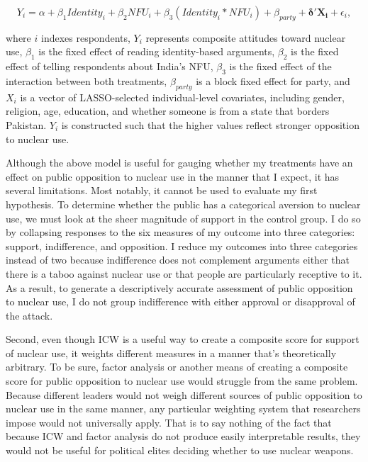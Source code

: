 \documentclass[12pt]{article}
\begin{document}
\begin{equation}
Y_i=\alpha+\beta_1Identity_i+\beta_2NFU_i+\beta_3(Identity_i*NFU_i)+\beta_{party}+\mathbf{\delta'X_i} +\epsilon_{i},
\end{equation}

\noindent
where $i$ indexes respondents, $Y_i$ represents composite attitudes toward nuclear use, $\beta_1$ is the fixed effect of reading identity-based arguments, $\beta_2$ is the fixed effect of telling respondents about India's NFU, $\beta_3$ is the fixed effect of the interaction between both treatments, $\beta_{party}$ is a block fixed effect for party, and $X_i$ is a vector of LASSO-selected individual-level covariates, including gender, religion, age, education, and whether someone is from a state that borders Pakistan. $Y_i$ is constructed such that the higher values reflect stronger opposition to nuclear use.

Although the above model is useful for gauging whether my treatments have an effect on public opposition to nuclear use in the manner that I expect, it has several limitations. Most notably, it cannot be used to evaluate my first hypothesis. To determine whether the public has a categorical aversion to nuclear use, we must look at the sheer magnitude of support in the control group. I do so by collapsing responses to the six measures of my outcome into three categories: support, indifference, and opposition. I reduce my outcomes into three categories instead of two because indifference does not complement arguments either that there is a taboo against nuclear use or that people are particularly receptive to it. As a result, to generate a descriptively accurate assessment of public opposition to nuclear use, I do not group indifference with either approval or disapproval of the attack.

Second, even though ICW is a useful way to create a composite score for support of nuclear use, it weights different measures in a manner that's theoretically arbitrary. To be sure, factor analysis or another means of creating a composite score for public opposition to nuclear use would struggle from the same problem. Because different leaders would not weigh different sources of public opposition to nuclear use in the same manner, any particular weighting system that researchers impose would not universally apply. That is to say nothing of the fact that because ICW and factor analysis do not produce easily interpretable results, they would not be useful for political elites deciding whether to use nuclear weapons. 
\end{document}
